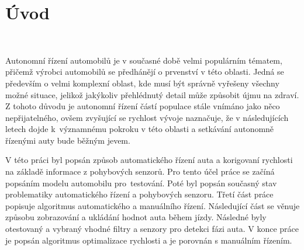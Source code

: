 \chapter*{Úvod}
\label{sec:Introduction}
\

Autonomní řízení automobilů je v současné době velmi populárním tématem, přičemž
výrobci automobilů se předhánějí o prvenství v této oblasti. Jedná se především o
velmi komplexní oblast, kde musí být správně vyřešeny všechny možné situace, jelikož
jakýkoliv přehlédnutý detail může způsobit újmu na zdraví. Z tohoto důvodu je
autonomní řízení částí populace stále vnímáno jako něco  nepřijatelného, ovšem
zvyšující se rychlost vývoje naznačuje, že v následujících letech dojde k~významnému
pokroku v této oblasti a setkávání autonomně řízenými auty bude běžným jevem.

V této práci byl popsán způsob automatického řízení auta a korigovaní rychlosti na
základě informace z pohybových senzorů. Pro tento účel práce se začíná popsáním modelu
automobilu pro~testování. Poté byl popsán současný stav problematiky automatického
řízení a pohybových senzoru. Třetí část práce popisuje algoritmus automatického a
manuálního řízení. Následující část se věnuje způsobu zobrazování a ukládání hodnot
auta během jízdy. Následné byly otestovaný a vybraný vhodné filtry a senzory pro
detekci fázi auta. V konce práce je popsán algoritmus optimalizace rychlosti a je
porovnán s manuálním řízením.

\endinput
